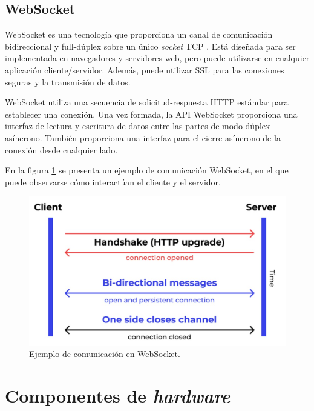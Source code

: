 \subsection{WebSocket}

WebSocket es una tecnología que proporciona un canal de comunicación bidireccional y full-dúplex \citep{WEBSITE:FULLDUPLEX} sobre un único \textit{socket} TCP \citep{WEBSITE:TCP}. Está diseñada para ser implementada en navegadores y servidores web, pero puede utilizarse en cualquier aplicación cliente/servidor. Además, puede utilizar SSL para las conexiones seguras y la transmisión de datos.

WebSocket utiliza una secuencia de solicitud-respuesta HTTP estándar para establecer una conexión. Una vez formada, la API WebSocket proporciona una interfaz de lectura y escritura de datos entre las partes de modo dúplex asíncrono. También proporciona una interfaz para el cierre asíncrono de la conexión desde cualquier lado.

En la figura \ref{fig:ejemploDeComunicacionEnWebSocket} se presenta un ejemplo de comunicación WebSocket, en el que puede observarse cómo interactúan el cliente y el servidor.

\begin{figure}[H]
	\centering
	\includegraphics[width=.9\textwidth]{./Figures/Ejemplo de comunicacion en WebSocket.jpg}
	\caption{Ejemplo de comunicación en WebSocket\protect\footnotemark.}
	\label{fig:ejemploDeComunicacionEnWebSocket}
\end{figure}


\section{Componentes de \emph{hardware}}


